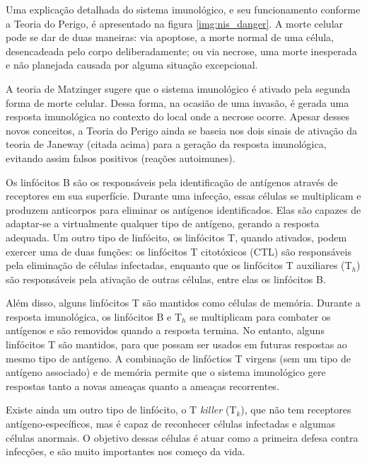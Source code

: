 Uma explicação detalhada do sistema imunológico, e seu funcionamento conforme a Teoria do Perigo, é apresentado na figura \ref{img:nis_danger}. A morte celular pode se dar de duas maneiras: via apoptose, a morte normal de uma célula, desencadeada pelo corpo deliberadamente; ou via necrose, uma morte inesperada e não planejada causada por alguma situação excepcional.

A teoria de Matzinger sugere que o sistema imunológico é ativado pela segunda forma de morte celular. Dessa forma, na ocasião de uma invasão, é gerada uma resposta imunológica no contexto do local onde a necrose ocorre. Apesar desses novos conceitos, a Teoria do Perigo ainda se baseia nos dois sinais de ativação da teoria de Janeway (citada acima) para a geração da resposta imunológica, evitando assim falsos positivos (reações autoimunes).

Os linfócitos B são os responsáveis pela identificação de antígenos através de receptores em sua superfície. Durante uma infecção, essas células se multiplicam e produzem anticorpos para eliminar os antígenos identificados. Elas são capazes de adaptar-se a virtualmente qualquer tipo de antígeno, gerando a resposta adequada. Um outro tipo de linfócito, os linfócitos T, quando ativados, podem exercer uma de duas funções: os linfócitos T citotóxicos (CTL) são responsáveis pela eliminação de células infectadas, enquanto que os linfócitos T auxiliares (T$_{h}$) são responsáveis pela ativação de outras células, entre elas os linfócitos B.

Além disso, alguns linfócitos T são mantidos como células de memória. Durante a resposta imunológica, os linfócitos B e T$_{h}$ se multiplicam para combater os antígenos e são removidos quando a resposta termina. No entanto, alguns linfócitos T são mantidos, para que possam ser usados em futuras respostas ao mesmo tipo de antígeno. A combinação de linfóctios T virgens (sem um tipo de antígeno associado) e de memória permite que o sistema imunológico gere respostas tanto a novas ameaças quanto a ameaças recorrentes.

Existe ainda um outro tipo de linfócito, o T \emph{killer} (T$_{k}$), que não tem receptores antígeno-específicos, mas é capaz de reconhecer células infectadas e algumas células anormais. O objetivo dessas células é atuar como a primeira defesa contra infecções, e são muito importantes nos começo da vida.

